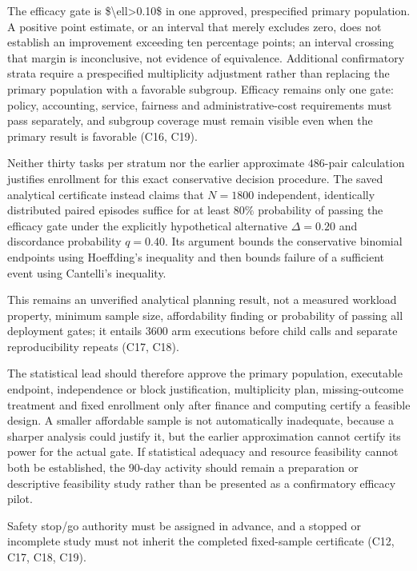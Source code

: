 \documentclass[11pt]{article}
\begin{document}
The efficacy gate is \$\textbackslash{}ell\textgreater{}0.10\$ in one approved, prespecified primary population. A positive point estimate, or an interval that merely excludes zero, does not establish an improvement exceeding ten percentage points; an interval crossing that margin is inconclusive, not evidence of equivalence. Additional confirmatory strata require a prespecified multiplicity adjustment rather than replacing the primary population with a favorable subgroup. Efficacy remains only one gate: policy, accounting, service, fairness and administrative-cost requirements must pass separately, and subgroup coverage must remain visible even when the primary result is favorable (C16, C19).

Neither thirty tasks per stratum nor the earlier approximate $486$-pair calculation justifies enrollment for this exact conservative decision procedure. The saved analytical certificate instead claims that $N=1800$ independent, identically distributed paired episodes suffice for at least $80\%$ probability of passing the efficacy gate under the explicitly hypothetical alternative $\Delta=0.20$ and discordance probability $q=0.40$. Its argument bounds the conservative binomial endpoints using Hoeffding\textquoteright{}s inequality and then bounds failure of a sufficient event using Cantelli\textquoteright{}s inequality.

This remains an unverified analytical planning result, not a measured workload property, minimum sample size, affordability finding or probability of passing all deployment gates; it entails $3600$ arm executions before child calls and separate reproducibility repeats (C17, C18).

The statistical lead should therefore approve the primary population, executable endpoint, independence or block justification, multiplicity plan, missing-outcome treatment and fixed enrollment only after finance and computing certify a feasible design. A smaller affordable sample is not automatically inadequate, because a sharper analysis could justify it, but the earlier approximation cannot certify its power for the actual gate. If statistical adequacy and resource feasibility cannot both be established, the 90-day activity should remain a preparation or descriptive feasibility study rather than be presented as a confirmatory efficacy pilot.

Safety stop/go authority must be assigned in advance, and a stopped or incomplete study must not inherit the completed fixed-sample certificate (C12, C17, C18, C19).
\end{document}

